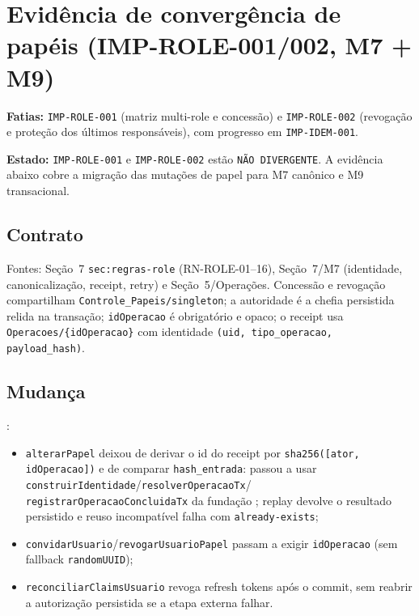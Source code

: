 \section{Evidência de convergência de papéis (IMP-ROLE-001/002, M7 + M9)}

\textbf{Fatias:} \texttt{IMP-ROLE-001} (matriz multi-role e concessão) e
\texttt{IMP-ROLE-002} (revogação e proteção dos últimos responsáveis), com
progresso em \texttt{IMP-IDEM-001}.

\textbf{Estado:} \texttt{IMP-ROLE-001} e \texttt{IMP-ROLE-002} estão
\texttt{NÃO DIVERGENTE}. A evidência abaixo cobre
a migração das mutações de papel para M7 canônico e M9 transacional.

\subsection{Contrato}

Fontes: Seção~7 \texttt{sec:regras-role} (RN-ROLE-01--16), Seção~7/M7
(identidade, canonicalização, receipt, retry) e Seção~5/Operações. Concessão e
revogação compartilham \texttt{Controle\_Papeis/singleton}; a autoridade é a
chefia persistida relida na transação; \texttt{idOperacao} é obrigatório e opaco;
o receipt usa \texttt{Operacoes/\{idOperacao\}} com identidade
\texttt{(uid, tipo\_operacao, payload\_hash)}.

\subsection{Mudança}

:

\begin{itemize}
  \item \texttt{alterarPapel} deixou de derivar o id do receipt por
  \texttt{sha256([ator, idOperacao])} e de comparar \texttt{hash\_entrada}: passou
  a usar \texttt{construirIdentidade}/\texttt{resolverOperacaoTx}/
  \texttt{registrarOperacaoConcluidaTx} da fundação
  ; replay devolve o resultado persistido e
  reuso incompatível falha com \texttt{already-exists};
  \item \texttt{convidarUsuario}/\texttt{revogarUsuarioPapel} passam a exigir
  \texttt{idOperacao} (sem fallback \texttt{randomUUID});
  \item \texttt{reconciliarClaimsUsuario} revoga refresh tokens após o commit,
  sem reabrir a autorização persistida se a etapa externa falhar.
\end{itemize}

